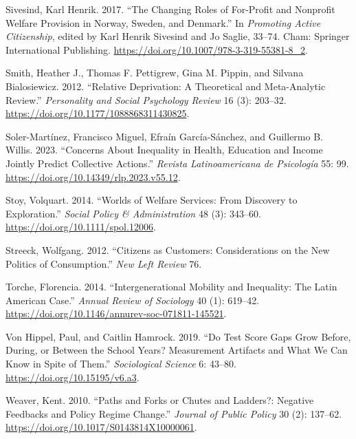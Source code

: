 \documentclass[
  letterpaper,
  DIV=11,
  numbers=noendperiod]{scrartcl}
\newlength{\cslhangindent}
\newlength{\cslentryspacingunit} %
\newenvironment{CSLReferences}[2] %
 {%
  \setlength{\parindent}{0pt}
  \ifodd #1
  \let\oldpar\par
  \def\par{\hangindent=\cslhangindent\oldpar}
  \fi
  \setlength{\parskip}{#2\cslentryspacingunit}
 }%
 {}
\begin{document}
\begin{CSLReferences}{1}{0}
\leavevmode{}%
Sivesind, Karl Henrik. 2017. {``The {Changing Roles} of {For-Profit} and
{Nonprofit Welfare Provision} in {Norway}, {Sweden}, and {Denmark}.''}
In \emph{Promoting {Active Citizenship}}, edited by Karl Henrik Sivesind
and Jo Saglie, 33--74. Cham: Springer International Publishing.
\url{https://doi.org/10.1007/978-3-319-55381-8_2}.

\leavevmode{}%
Smith, Heather J., Thomas F. Pettigrew, Gina M. Pippin, and Silvana
Bialosiewicz. 2012. {``Relative {Deprivation}: {A Theoretical} and
{Meta-Analytic Review}.''} \emph{Personality and Social Psychology
Review} 16 (3): 203--32. \url{https://doi.org/10.1177/1088868311430825}.

\leavevmode{}%
Soler-Martínez, Francisco Miguel, Efraín García-Sánchez, and Guillermo
B. Willis. 2023. {``Concerns {About Inequality} in {Health}, {Education}
and {Income Jointly Predict Collective Actions}.''} \emph{Revista
Latinoamericana de Psicolog{í}a} 55: 99.
\url{https://doi.org/10.14349/rlp.2023.v55.12}.

\leavevmode{}%
Stoy, Volquart. 2014. {``Worlds of {Welfare Services}: {From Discovery}
to {Exploration}.''} \emph{Social Policy \& Administration} 48 (3):
343--60. \url{https://doi.org/10.1111/spol.12006}.

\leavevmode{}%
Streeck, Wolfgang. 2012. {``Citizens as {Customers}: {Considerations} on
the {New Politics} of {Consumption}.''} \emph{New Left Review} 76.

\leavevmode{}%
Torche, Florencia. 2014. {``Intergenerational {Mobility} and
{Inequality}: {The Latin American Case}.''} \emph{Annual Review of
Sociology} 40 (1): 619--42.
\url{https://doi.org/10.1146/annurev-soc-071811-145521}.

\leavevmode{}%
Von Hippel, Paul, and Caitlin Hamrock. 2019. {``Do {Test Score Gaps
Grow} Before, During, or Between the {School Years}? {Measurement
Artifacts} and {What We Can Know} in {Spite} of {Them}.''}
\emph{Sociological Science} 6: 43--80.
\url{https://doi.org/10.15195/v6.a3}.

\leavevmode{}%
Weaver, Kent. 2010. {``Paths and {Forks} or {Chutes} and {Ladders}?:
{Negative Feedbacks} and {Policy Regime Change}.''} \emph{Journal of
Public Policy} 30 (2): 137--62.
\url{https://doi.org/10.1017/S0143814X10000061}.


\end{CSLReferences}
\end{document}
